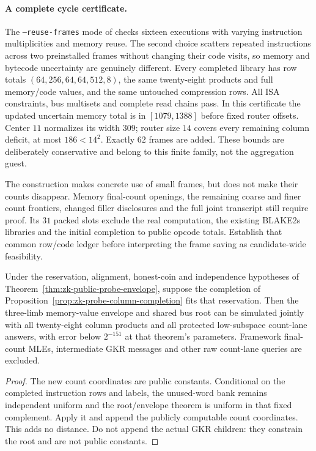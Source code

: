 \paragraph{A complete cycle certificate.} The \texttt{--reuse-frames} mode of  checks sixteen executions with varying instruction multiplicities and memory reuse. The second choice scatters repeated instructions across two preinstalled frames without changing their code visits, so memory and bytecode uncertainty are genuinely different. Every completed library has row totals $(64,256,64,64,512,8)$, the same twenty-eight products and full memory/code values, and the same untouched compression rows. All ISA constraints, bus multisets and complete read chains pass. In this certificate the updated uncertain memory total is in $[1079,1388]$ before fixed router offsets. Center $11$ normalizes its width $309$; router size $14$ covers every remaining column deficit, at most $186<14^2$. Exactly $62$ frames are added. These bounds are deliberately conservative and belong to this finite family, not the aggregation guest.

The construction makes concrete use of small frames, but does not make their counts disappear. Memory final-count openings, the remaining coarse and finer count frontiers, changed filler disclosures and the full joint transcript still require proof. Its $31$ packed slots exclude the real computation, the existing BLAKE2s libraries and the initial completion to public opcode totals. Establish that common row/code ledger before interpreting the frame saving as candidate-wide feasibility.

\begin{corollary}\label{cor:zk-probe-count-memory-root}
Under the reservation, alignment, honest-coin and independence hypotheses of Theorem~\ref{thm:zk-public-probe-envelope}, suppose the completion of Proposition~\ref{prop:zk-probe-column-completion} fits that reservation. Then the three-limb memory-value envelope and shared bus root can be simulated jointly with all twenty-eight column products and all protected low-subspace count-lane answers, with error below $2^{-151}$ at that theorem's parameters. Framework final-count MLEs, intermediate GKR messages and other raw count-lane queries are excluded.
\end{corollary}
\begin{proof}
The new count coordinates are public constants. Conditional on the completed instruction rows and labels, the unused-word bank remains independent uniform and the root/envelope theorem is uniform in that fixed complement. Apply it and append the publicly computable count coordinates. This adds no distance. Do not append the actual GKR children: they constrain the root and are not public constants.
\end{proof}

